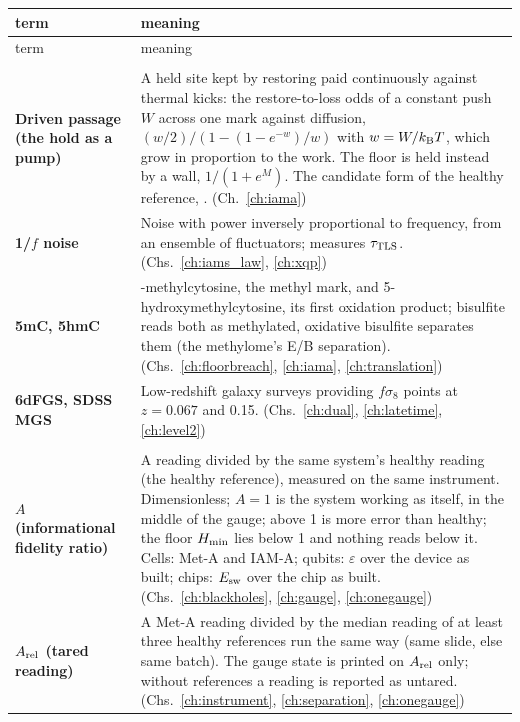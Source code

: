 {\small\begin{longtable}{@{}>{\raggedright\arraybackslash}p{}>{\raggedright\arraybackslash}p{}@{}}
\toprule term & meaning\\\midrule\endfirsthead
\toprule term & meaning\\\midrule\endhead
\multicolumn{2}{@{}l}{\normalsize\textbf{0--9}}\\[2pt]
\textbf{Driven passage (the hold as a pump)} & A held site kept by restoring paid continuously against thermal kicks: the restore-to-loss odds of a constant push $W$ across one mark against diffusion, $(w/2)/(1-(1-e^{-w})/w)$ with $w=W/k_{\mathrm B} T$, which grow in proportion to the work. The floor is held instead by a wall, $1/(1+e^{M})$. The candidate form of the healthy reference, \conjecture{}. {\footnotesize(Ch.~\ref{ch:iama})}\\[1pt]
\textbf{1/$f$ noise} & Noise with power inversely proportional to frequency, from an ensemble of fluctuators; measures $\tau_{\mathrm{TLS}}$. {\footnotesize(Chs.~\ref{ch:iams_law}, \ref{ch:xqp})}\\[1pt]
\iamrowrule
\textbf{5mC, 5hmC} & 5-methylcytosine, the methyl mark, and 5-hydroxymethylcytosine, its first oxidation product; bisulfite reads both as methylated, oxidative bisulfite separates them (the methylome's E/B separation). {\footnotesize(Chs.~\ref{ch:floorbreach}, \ref{ch:iama}, \ref{ch:translation})}\\[1pt]
\iamrowrule
\textbf{6dFGS, SDSS MGS} & Low-redshift galaxy surveys providing $f\sigma_8$ points at $z=0.067$ and 0.15. {\footnotesize(Chs.~\ref{ch:dual}, \ref{ch:latetime}, \ref{ch:level2})}\\[1pt]
\multicolumn{2}{@{}l}{\normalsize\textbf{A}}\\[2pt]
\textbf{$A$ (informational fidelity ratio)} & A reading divided by the same system's healthy reading (the healthy reference), measured on the same instrument. Dimensionless; $A=1$ is the system working as itself, in the middle of the gauge; above 1 is more error than healthy; the floor $H_{\min}$ lies below 1 and nothing reads below it. Cells: Met-A and IAM-A; qubits: $\varepsilon$ over the device as built; chips: $E_{\rm sw}$ over the chip as built. {\footnotesize(Chs.~\ref{ch:blackholes}, \ref{ch:gauge}, \ref{ch:onegauge})}\\[1pt]
\iamrowrule
\textbf{$A_{\rm rel}$ (tared reading)} & A Met-A reading divided by the median reading of at least three healthy references run the same way (same slide, else same batch). The gauge state is printed on $A_{\rm rel}$ only; without references a reading is reported as untared. {\footnotesize(Chs.~\ref{ch:instrument}, \ref{ch:separation}, \ref{ch:onegauge})}\\[1pt]

\end{longtable}}
